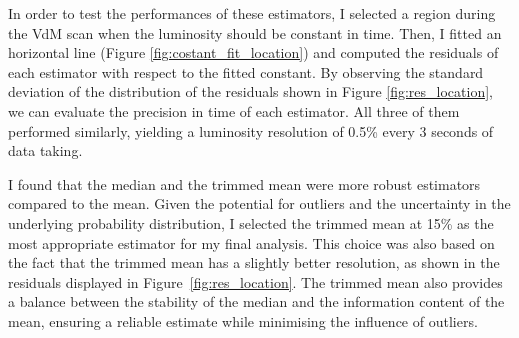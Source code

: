 In order to test the performances of these estimators, I selected a region during the VdM scan when the luminosity should be constant in time. Then, I fitted an horizontal line (Figure \ref{fig:costant_fit_location}) and computed the residuals of each estimator with respect to the fitted constant. By observing the standard deviation of the distribution of the residuals shown in Figure \ref{fig:res_location}, we can evaluate the precision in time of each estimator. All three of them performed similarly, yielding a luminosity resolution of 0.5\% every 3 seconds of data taking.

I found that the median and the trimmed mean were more robust estimators compared to the mean. Given the potential for outliers and the uncertainty in the underlying probability distribution, I selected the trimmed mean at 15\% as the most appropriate estimator for my final analysis. This choice was also based on the fact that the trimmed mean has a slightly better resolution, as shown in the residuals displayed in Figure~\ref{fig:res_location}. The trimmed mean also provides a balance between the stability of the median and the information content of the mean, ensuring a reliable estimate while minimising the influence of outliers.

